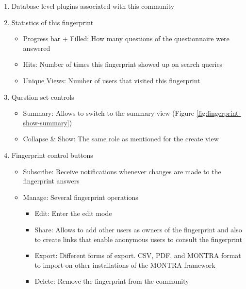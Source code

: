 \begin{enumerate}
    \item Database level plugins associated with this community
    \item Statistics of this fingerprint
        \begin{itemize}
            \item Progress bar + Filled: How many questions of the questionnaire were answered
            \item Hits: Number of times this fingerprint showed up on search queries
            \item Unique Views: Number of users that visited this fingerprint
        \end{itemize}
    \item Question set controls
        \begin{itemize}
            \item Summary: Allows to switch to the summary view (Figure \ref{fig:fingerprint-show-summary})
            \item Collapse \& Show: The same role as mentioned for the create view
        \end{itemize}
    \item Fingerprint control buttons
        \begin{itemize}
            \item Subscribe: Receive notifications whenever changes are made to the fingerprint answers
            \item Manage: Several fingerprint operations
                \begin{itemize}
                    \item Edit: Enter the edit mode
                    \item Share: Allows to add other users as owners of the fingerprint and also to create links that enable anonymous users to consult the fingerprint
                    \item Export: Different forms of export. CSV, PDF, and MONTRA format to import on other installations of the MONTRA framework
                    \item Delete: Remove the fingerprint from the community
                \end{itemize}
        \end{itemize}
\end{enumerate}

